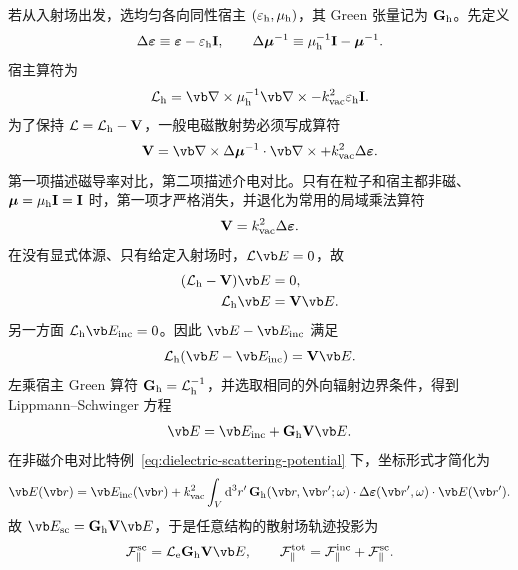 若从入射场出发，选均匀各向同性宿主 $(\varepsilon_{\rm h},\mu_{\rm h})$，其 Green 张量记为 $\mathbf G_{\rm h}$。先定义
\begin{equation}
 \Delta\boldsymbol\varepsilon
 \equiv\boldsymbol\varepsilon-\varepsilon_{\rm h}\mathbf I,
 \qquad
 \Delta\boldsymbol\mu^{-1}
 \equiv\mu_{\rm h}^{-1}\mathbf I-\boldsymbol\mu^{-1}.
\end{equation}
宿主算符为
\begin{equation}
 \mathcal L_{\rm h}
 =\vb\nabla\times\mu_{\rm h}^{-1}\vb\nabla\times
 -k_{\rm vac}^2\varepsilon_{\rm h}\mathbf I.
\end{equation}
为了保持 $\mathcal L=\mathcal L_{\rm h}-\mathbf V$，一般电磁散射势必须写成算符
\begin{equation}
 {
 \mathbf V
 =\vb\nabla\times\Delta\boldsymbol\mu^{-1}\cdot\vb\nabla\times
 +k_{\rm vac}^2\Delta\boldsymbol\varepsilon.}
 \label{eq:general-electromagnetic-scattering-potential}
\end{equation}
第一项描述磁导率对比，第二项描述介电对比。只有在粒子和宿主都非磁、$\boldsymbol\mu=\mu_{\rm h}\mathbf I=\mathbf I$ 时，第一项才严格消失，并退化为常用的局域乘法算符
\begin{equation}
 {\mathbf V=k_{\rm vac}^2\Delta\boldsymbol\varepsilon.}
 \label{eq:dielectric-scattering-potential}
\end{equation}
在没有显式体源、只有给定入射场时，$\mathcal L\vb E=0$，故
\begin{align}
(\mathcal L_{\rm h}-\mathbf V)\vb E&=0,\\
\mathcal L_{\rm h}\vb E&=\mathbf V\vb E.
\end{align}
另一方面 $\mathcal L_{\rm h}\vb E_{\rm inc}=0$。因此 $\vb E-\vb E_{\rm inc}$ 满足
\begin{equation}
\mathcal L_{\rm h}(\vb E-\vb E_{\rm inc})=\mathbf V\vb E.
\end{equation}
左乘宿主 Green 算符 $\mathbf G_{\rm h}=\mathcal L_{\rm h}^{-1}$，并选取相同的外向辐射边界条件，得到 Lippmann--Schwinger 方程
\begin{equation}
{
\vb E=\vb E_{\rm inc}+\mathbf G_{\rm h}\mathbf V\vb E.}
\label{eq:LS-operator}
\end{equation}
在非磁介电对比特例~\cref{eq:dielectric-scattering-potential} 下，坐标形式才简化为
\begin{equation}
\vb E(\vb r)=\vb E_{\rm inc}(\vb r)
+k_{\rm vac}^2\int_V\dd^3r'\,
\mathbf G_{\rm h}(\vb r,\vb r';\omega)
\cdot\Delta\boldsymbol\varepsilon(\vb r',\omega)
\cdot\vb E(\vb r').
\label{eq:LS_E}
\end{equation}
故 $\vb E_{\rm sc}=\mathbf G_{\rm h}\mathbf V\vb E$，于是任意结构的散射场轨迹投影为
\begin{equation}
{
\mathcal F_{\parallel}^{\rm sc}=\mathcal L_{\rm e}\mathbf G_{\rm h}\mathbf V\vb E,\qquad
\mathcal F_{\parallel}^{\rm tot}=\mathcal F_{\parallel}^{\rm inc}+\mathcal F_{\parallel}^{\rm sc}.}
\label{eq:general-green-pinem-operator}
\end{equation}

